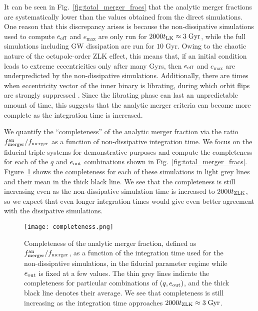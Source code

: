 \documentclass[
        fleqn,
        usenatbib,
    ]{mnras}
\begin{document}
It can be seen in Fig.~\ref{fig:total_merger_fracs} that the analytic
merger fractions are systematically lower than the values obtained from the
direct simulations. One reason that this discrepancy arises is because the
non-dissipative simulations used to compute $e_{\rm eff}$ and $e_{\max}$ are
only run for $2000 t_{\rm LK} \approx 3\;\mathrm{Gyr}$, while the full
simulations including GW dissipation are run for $10\;\mathrm{Gyr}$. Owing to
the chaotic nature of the octupole-order ZLK effect, this means that, if an
initial condition leads to extreme eccentricities only after many Gyrs, then
$e_{\rm eff}$ and $e_{\max}$ are underpredicted by the non-dissipative
simulations. Additionally, there are times when eccentricity vector of the inner
binary is librating, during which orbit flips are strongly suppressed
\citep{katz2011long}. Since the librating phase can last an unpredictable amount
of time, this suggests that the analytic merger criteria can become more
complete as the integration time is increased.

We quantify the ``completeness'' of the analytic merger fraction via the ratio
$f_{\rm merger}^{\rm an} / f_{\rm merger}$ as a function of non-dissipative
integration time. We focus on the fiducial triple systems for
demonstrative purposes and compute the completeness for each of the $q$ and
$e_{\rm out}$ combinations shown in Fig.~\ref{fig:total_merger_fracs}.
Figure~\ref{fig:completeness} shows the completeness for each of these
simulations in light grey lines and their mean in the thick black line. We see
that the completeness is still increasing even as the non-dissipative simulation
time is increased to $2000t_{\rm ZLK}$, so we expect that even longer
integration times would give even better agreement with the dissipative
simulations.
\begin{figure}
    \centering
    \texttt{[image: completeness.png]}
    \caption{Completeness of the analytic merger fraction, defined as
    $f_{\rm merger}^{\rm an} / f_{\rm merger}$, as a function of the integration time
    used for the non-dissipative simulations, in the fiducial
    parameter regime while $e_{\rm out}$ is fixed at a few values. The thin grey
    lines indicate the completeness for particular combinations of $(q, e_{\rm
    out})$, and the thick black line denotes their average. We see that
    completeness is still increasing as the integration time approaches $2000
    t_{\rm ZLK} \approx 3\;\mathrm{Gyr}$. }\label{fig:completeness}
\end{figure}
\end{document}
